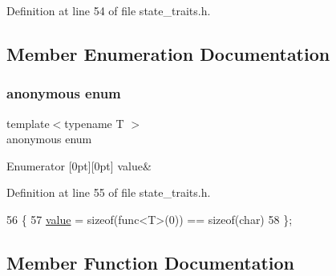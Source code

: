 Definition at line 54 of file state\+\_\+traits.\+h.



\subsection{Member Enumeration Documentation}
\mbox{\label{classsmacc_1_1HasStandardOnExit_a97479f6c9a7d3b03a03acbd2629f3b3a}} 
\subsubsection{\texorpdfstring{anonymous enum}{anonymous enum}}
{\footnotesize\ttfamily template$<$typename T $>$ \\
anonymous enum}

\begin{DoxyEnumFields}{Enumerator}
[0pt][0pt]{}\mbox{\label{classsmacc_1_1HasStandardOnExit_a97479f6c9a7d3b03a03acbd2629f3b3aa2105bb2411da08ef49f5b1fa5ce115c5}} 
value&\\
\hline

\end{DoxyEnumFields}


Definition at line 55 of file state\+\_\+traits.\+h.


\begin{DoxyCode}
56         \{
57             \hyperlink{classsmacc_1_1HasStandardOnExit_a97479f6c9a7d3b03a03acbd2629f3b3aa2105bb2411da08ef49f5b1fa5ce115c5}{value} = \textcolor{keyword}{sizeof}(func<T>(0)) == \textcolor{keyword}{sizeof}(char)
58         \};
\end{DoxyCode}


\subsection{Member Function Documentation}
\mbox{\label{classsmacc_1_1HasStandardOnExit_ac0244e38b6233bdd304fe885c7a12e9f}} 
